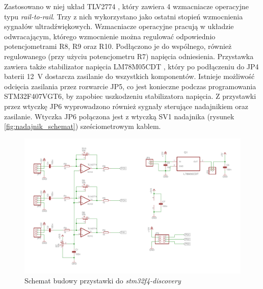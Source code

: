 Zastosowano w niej układ TLV2774 \cite{bib:TLV2774}, który zawiera 4 wzmacniacze operacyjne typu
\textit{rail-to-rail}. Trzy z nich wykorzystano jako ostatni stopień wzmocnienia sygnałów ultradźwiękowych. 
Wzmacniacze operacyjne pracują w układzie odwracającym, którego wzmocnienie można regulować odpowiednio potencjometrami R8, R9 oraz R10. 
Podłączono je do wspólnego, również regulowanego (przy użyciu potencjometru R7) napięcia odniesienia.
Przystawka zawiera także stabilizator napięcia LM78M05CDT \cite{bib:LM78M05CDT}, który po podłączeniu 
do JP4 baterii \SI{12}{V} dostarcza zasilanie do wszystkich komponentów. 
Istnieje możliwość odcięcia zasilania przez rozwarcie JP5, co jest konieczne podczas programowania
STM32F407VGT6, by zapobiec uszkodzeniu stabilizatora napięcia.
Z przystawki przez wtyczkę JP6 wyprowadzono również sygnały sterujące nadajnikiem oraz zasilanie.
Wtyczka JP6 połączona jest z wtyczką SV1 nadajnika (rysunek \ref{fig:nadajnik_schemat}) sześciometrowym kablem.

 \begin{figure}[h]
    \centering
    \includegraphics[width=1\textwidth, trim= 5mm 0mm 0mm 0mm,clip]{mainboard2}
    \caption{Schemat budowy przystawki do \textit{stm32f4-discovery}}
    \label{fig:przystawka}
\end{figure}


